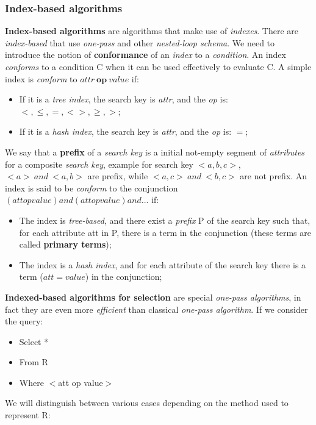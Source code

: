 \documentclass{article}
\begin{document}
\subsubsection{Index-based algorithms}
\textbf{Index-based algorithms} are algorithms that make use of \emph{indexes}. There are \emph{index-based} that use \emph{one-pass} and other \emph{nested-loop schema}. We need to introduce the notion of \textbf{conformance} of an \emph{index} to a \emph{condition}. An index \emph{conforms} to a condition C when it can be used effectively to evaluate C. A simple index is \emph{conform} to $attr\ \mathbf{op}\ value$ if:
\begin{itemize}
\item If it is a \emph{tree index}, the search key is \emph{attr}, and the \emph{op} is: $<,\leq,=, <>, \geq, >$;
\item If it is a \emph{hash index}, the search key is \emph{attr}, and the \emph{op} is: $=$;
\end{itemize}
We say that a \textbf{prefix} of a \emph{search key} is a initial not-empty segment of \emph{attributes} for a composite \emph{search key}, example for search key $<a,b,c>$, $<a>\ and\ <a,b>$ are prefix, while $<a,c>\ and\ <b,c>$ are not prefix. An index is said to be \emph{conform} to the conjunction $(att op value) and (att op value) and ... $ if:
\begin{itemize}
\item The index is \emph{tree-based}, and there exist a \emph{prefix} P of the search key such that, for each attribute att in P, there is a term in the conjunction (these terms are called \textbf{primary terms});
\item The index is a \emph{hash index}, and for each attribute of the search key there is a term ($att = value$) in the conjunction;
\end{itemize}
\textbf{Indexed-based algorithms for selection} are special \emph{one-pass algorithms}, in fact they are even more \emph{efficient} than classical \emph{one-pass algorithm}. If we consider the query:
\begin{itemize}
\item Select *
\item From R
\item Where $<$att op value$>$
\end{itemize}
We will distinguish between various cases depending on the method used to represent R:
\end{document}

